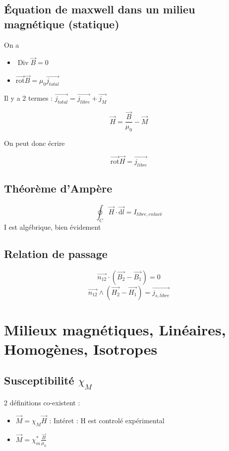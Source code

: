 \documentclass[french]{yLectureNote}
\renewcommand{\vec}{\overrightarrow}
\newcommand{\dd}{\mathrm{d}}
\DeclareMathOperator{\Div}{Div}
\newcommand{\rot}{\vec{\mathrm{rot}}}
\begin{document}
\subsection{Équation de maxwell dans un milieu magnétique (statique)}
On a 
\begin{itemize}
    \item $\Div \vec{B} = 0$
    \item $\rot{\vec{B}} = \mu_0 \vec{j_{total}}$
\end{itemize}
Il y a 2 termes : $\vec{j_{total}} = \vec{j_{libre}}+\vec{j_{M}}$

\begin{definition}
    $$\vec{H} = \frac{\vec{B}}{\mu_0}-\vec{M}$$
\end{definition}
On peut donc écrire 
\begin{theorem}
    $$\rot{\vec{H}} = \vec{j_{libre}}$$
\end{theorem}
\subsection{Théorème d'Ampère}
\begin{theorem}
   $$ \oint_C \vec{H}\cdot \vec{\dd l} = I_{libre, enlacé}$$
   I est algébrique, bien évidement
\end{theorem}
\subsection{Relation de passage}
\begin{theorem}
    $$\vec{n_{12}}\cdot(\vec{B_2}-\vec{B_1}) = 0$$
    $$\vec{n_{12}}\wedge(\vec{H_2}-\vec{H_1}) = \vec{j_{s,libre}}$$
\end{theorem}
\section{Milieux magnétiques, Linéaires, Homogènes, Isotropes}
\subsection{Susceptibilité $\chi_M$}
2 définitions co-existent :
\begin{itemize}
    \item $\vec{M} = \chi_M \vec{H}$ : Intéret : H est controlé expérimental
    \item $\vec{M} = \chi_m^*\frac{\vec{B}}{\mu_0}$
\end{itemize}
\end{document}
